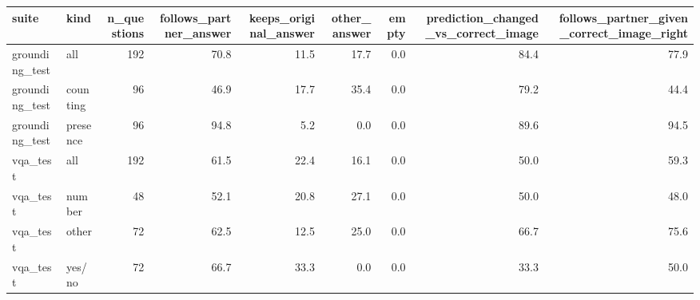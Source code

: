 \begin{tabular}{llrrrrrrr}
\toprule
suite & kind & n\_questions & follows\_partner\_answer & keeps\_original\_answer & other\_answer & empty & prediction\_changed\_vs\_correct\_image & follows\_partner\_given\_correct\_image\_right \\
\midrule
grounding\_test & all & 192 & 70.8 & 11.5 & 17.7 & 0.0 & 84.4 & 77.9 \\
grounding\_test & counting & 96 & 46.9 & 17.7 & 35.4 & 0.0 & 79.2 & 44.4 \\
grounding\_test & presence & 96 & 94.8 & 5.2 & 0.0 & 0.0 & 89.6 & 94.5 \\
vqa\_test & all & 192 & 61.5 & 22.4 & 16.1 & 0.0 & 50.0 & 59.3 \\
vqa\_test & number & 48 & 52.1 & 20.8 & 27.1 & 0.0 & 50.0 & 48.0 \\
vqa\_test & other & 72 & 62.5 & 12.5 & 25.0 & 0.0 & 66.7 & 75.6 \\
vqa\_test & yes/no & 72 & 66.7 & 33.3 & 0.0 & 0.0 & 33.3 & 50.0 \\
\bottomrule
\end{tabular}
